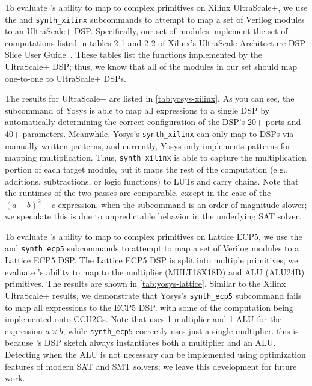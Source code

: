 To evaluate \lr's ability
  to map to complex primitives
  on Xilinx UltraScale+,
  we use the
  \texttt{\lowercaselr}
  and 
  \texttt{synth\_xilinx}
  subcommands
  to attempt to map
  a set of Verilog modules
  to an UltraScale+ DSP.
Specifically,
  our set of modules
  implement the set of computations
  listed in tables 2-1 and 2-2
  of Xilinx's
  UltraScale Architecture DSP Slice User Guide~\cite{userguide}.
These tables list
  the functions implemented
  by the UltraScale+ DSP;
  thus, we know that all of
  the modules in our set
  should map one-to-one
  to UltraScale+ DSPs.
  
The results for UltraScale+
  are listed in
  \cref{tab:yosys-xilinx}.
As you can see,
  the \texttt{\lowercaselr}
  subcommand of Yosys
  is able to map all expressions
  to a single DSP
  by automatically determining
  the correct configuration
  of the DSP's 20+ ports
  and 40+ parameters.
Meanwhile,
  Yosys's
  \texttt{synth\_xilinx}
  can only map to DSPs
  via manually written
  patterns,
  and currently, 
  Yosys only implements patterns
  for mapping multiplication.
Thus,
  \texttt{synth\_xilinx}
  is able to capture the multiplication
  portion of each target module,
  but it maps the rest of the computation
  (e.g., additions, subtractions,
  or logic functions)
  to LUTs and carry chains.
Note that the runtimes
  of the two passes are comparable,
  except in the case of the $(a-b)^2-c$
  expression,
  when the \texttt{\lowercaselr}
  subcommand
  is an order of magnitude slower;
  we speculate this is due to unpredictable
  behavior in the underlying SAT solver.
  
To evaluate \lr's ability
  to map to complex primitives
  on Lattice ECP5,
  we use the
  \texttt{\lowercaselr}
  and 
  \texttt{synth\_ecp5}
  subcommands
  to attempt to map
  a set of Verilog modules
  to a Lattice ECP5 DSP.
The Lattice ECP5 DSP
  is split into multiple primitives;
  we evaluate \lr's ability to map
  to the multiplier (MULT18X18D)
  and ALU (ALU24B) primitives.
The results are shown
  in \cref{tab:yosys-lattice}.
Similar to the Xilinx UltraScale+ results,
  we demonstrate that 
  Yosys's \texttt{synth\_ecp5}
  subcommand
  fails to map all expressions
  to the ECP5 DSP,
  with some of the computation
  being implemented onto CCU2Cs.
Note that
  \texttt{\lowercaselr}
  uses 1 multiplier and 1 ALU
  for the expression $a \times b$,
  while \texttt{synth\_ecp5}
  correctly uses just a single multiplier.
  this is because \lr's DSP sketch
  always instantiates both
  a multiplier and an ALU.
Detecting when the ALU is not necessary
  can be implemented using optimization features
  of modern SAT and SMT solvers;
  we leave this development
  for future work.
  
